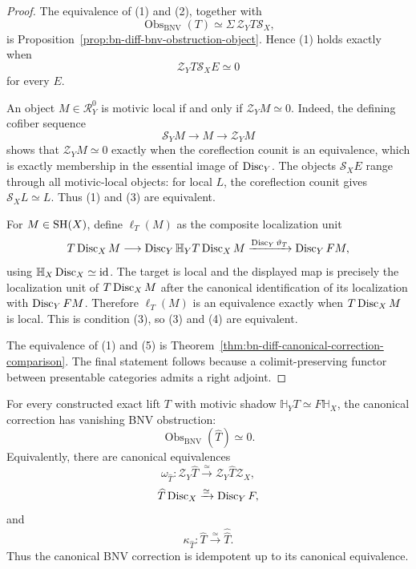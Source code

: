 \begin{proof}
The equivalence of (1) and (2), together with
\[
  \operatorname{Obs}_{\mathrm{BNV}}(T)
  \simeq
  \Sigma\,\mathcal Z_YT\mathcal S_X,
\]
is Proposition~\ref{prop:bn-diff-bnv-obstruction-object}.  Hence (1) holds
exactly when
\[
  \mathcal Z_YT\mathcal S_XE\simeq0
\]
for every \(E\).

An object \(M\in\mathcal R_Y^0\) is motivic local if and only if
\(\mathcal Z_YM\simeq0\).  Indeed, the defining cofiber sequence
\[
  \mathcal S_YM\longrightarrow M\longrightarrow\mathcal Z_YM
\]
shows that \(\mathcal Z_YM\simeq0\) exactly when the coreflection counit is an
equivalence, which is exactly membership in the essential image of
\(\operatorname{Disc}_Y\).  The objects \(\mathcal S_XE\) range through all motivic-local
objects: for local \(L\), the coreflection counit gives
\(\mathcal S_XL\simeq L\).  Thus (1) and (3) are equivalent.

For \(M\in\mathrm{SH}(X)\), define \(\ell_T(M)\) as the composite localization unit
\[
  T\operatorname{Disc}_XM
  \longrightarrow
  \operatorname{Disc}_Y\mathbb H_YT\operatorname{Disc}_XM
  \xrightarrow{\operatorname{Disc}_Y\vartheta_T}
  \operatorname{Disc}_YFM,
\]
using \(\mathbb H_X\operatorname{Disc}_X\simeq\operatorname{id}\).  The target is local and the displayed
map is precisely the localization unit of \(T\operatorname{Disc}_XM\) after the canonical
identification of its localization with \(\operatorname{Disc}_YFM\).  Therefore
\(\ell_T(M)\) is an equivalence exactly when \(T\operatorname{Disc}_XM\) is local.  This is
condition (3), so (3) and (4) are equivalent.

The equivalence of (1) and (5) is
Theorem~\ref{thm:bn-diff-canonical-correction-comparison}.  The final statement
follows because a colimit-preserving functor between presentable categories
admits a right adjoint.
\end{proof}

\begin{corollary}
\label{cor:bn-diff-canonical-correction-idempotent}
For every constructed exact lift \(T\) with motivic shadow
\(\mathbb H_YT\simeq F\mathbb H_X\), the canonical correction has vanishing
BNV obstruction:
\[
  \boxed{
  \operatorname{Obs}_{\mathrm{BNV}}(\widehat T)\simeq0.
  }
\]
Equivalently, there are canonical equivalences
\[
  \omega_{\widehat T}:
  \mathcal Z_Y\widehat T
  \xrightarrow{\simeq}
  \mathcal Z_Y\widehat T\mathcal Z_X,
\]
\[
  \widehat T\operatorname{Disc}_X
  \xrightarrow{\simeq}
  \operatorname{Disc}_YF,
\]
and
\[
  \boxed{
  \kappa_{\widehat T}:
  \widehat T
  \xrightarrow{\simeq}
  \widehat{\widehat T}.
  }
\]
Thus the canonical BNV correction is idempotent up to its canonical
equivalence.
\end{corollary}

